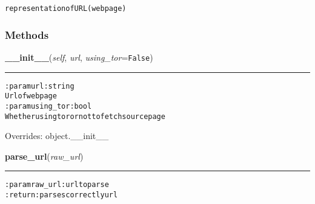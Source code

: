 \begin{alltt}
representation of URL (web page)
\end{alltt}



  \subsubsection{Methods}

    \vspace{0.5ex}

\hspace{.8\funcindent}\begin{boxedminipage}{\funcwidth}

    \raggedright \textbf{\_\_init\_\_}(\textit{self}, \textit{url}, \textit{using\_tor}={\tt False})

    \vspace{-1.5ex}

    \rule{\textwidth}{0.5\fboxrule}
\setlength{\parskip}{2ex}
\begin{alltt}

:param url: string
    Url of webpage
:param using\_tor: bool
    Whether using tor or not to fetch source page
\end{alltt}

\setlength{\parskip}{1ex}
      Overrides: object.\_\_init\_\_

    \end{boxedminipage}

    \label{hal:internet:web:Webpage:parse_url}

    \vspace{0.5ex}

\hspace{.8\funcindent}\begin{boxedminipage}{\funcwidth}

    \raggedright \textbf{parse\_url}(\textit{raw\_url})

    \vspace{-1.5ex}

    \rule{\textwidth}{0.5\fboxrule}
\setlength{\parskip}{2ex}
\begin{alltt}

:param raw\_url: url to parse
:return: parses correctly url
\end{alltt}

\setlength{\parskip}{1ex}
    \end{boxedminipage}

